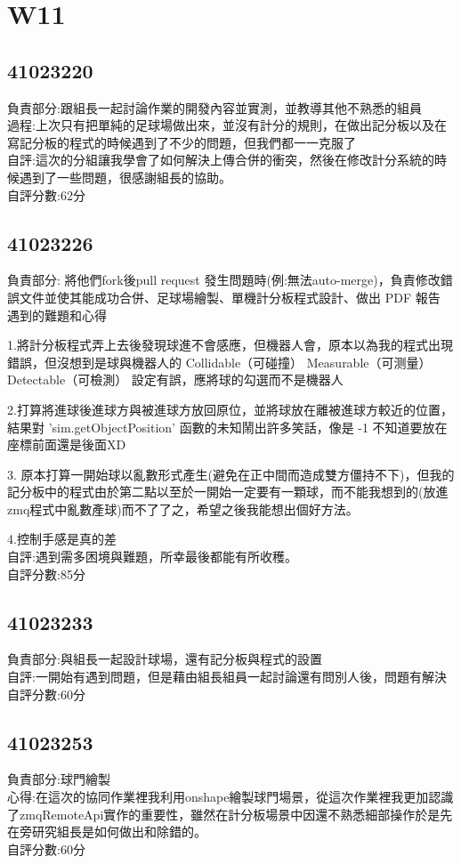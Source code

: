 \chapter{W11}


\section{41023220}

負責部分:跟組長一起討論作業的開發內容並實測，並教導其他不熟悉的組員\\過程:上次只有把單純的足球場做出來，並沒有計分的規則，在做出記分板以及在寫記分板的程式的時候遇到了不少的問題，但我們都一一克服了\\自評:這次的分組讓我學會了如何解決上傳合併的衝突，然後在修改計分系統的時候遇到了一些問題，很感謝組長的協助。\\自評分數:62分


\section{41023226}

負責部分: 將他們fork後pull request 發生問題時(例:無法auto-merge)，負責修改錯誤文件並使其能成功合併、足球場繪製、單機計分板程式設計、做出 PDF 報告\\遇到的難題和心得

1.將計分板程式弄上去後發現球進不會感應，但機器人會，原本以為我的程式出現錯誤，但沒想到是球與機器人的 Collidable（可碰撞） Measurable（可测量） Detectable（可檢測） 設定有誤，應將球的勾選而不是機器人

2.打算將進球後進球方與被進球方放回原位，並將球放在離被進球方較近的位置，結果對 'sim.getObjectPosition' 函數的未知鬧出許多笑話，像是 -1 不知道要放在座標前面還是後面XD

3. 原本打算一開始球以亂數形式產生(避免在正中間而造成雙方僵持不下)，但我的記分板中的程式由於第二點以至於一開始一定要有一顆球，而不能我想到的(放進zmq程式中亂數產球)而不了了之，希望之後我能想出個好方法。

4.控制手感是真的差\\自評:遇到需多困境與難題，所幸最後都能有所收穫。\\自評分數:85分

\section{41023233}

負責部分:與組長一起設計球場，還有記分板與程式的設置\\自評:一開始有遇到問題，但是藉由組長組員一起討論還有問別人後，問題有解決\\自評分數:60分


\section{41023253}

負責部分:球門繪製\\心得:在這次的協同作業裡我利用onshape繪製球門場景，從這次作業裡我更加認識了zmqRemoteApi實作的重要性，雖然在計分板場景中因還不熟悉細部操作於是先在旁研究組長是如何做出和除錯的。\\自評分數:60分